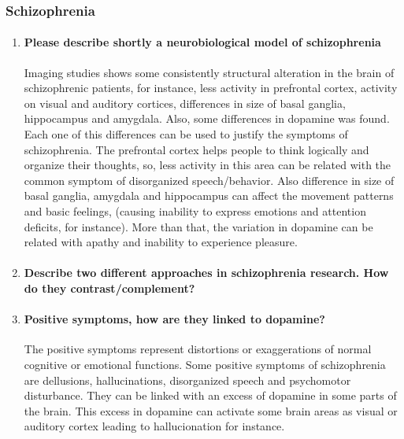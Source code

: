 \documentclass[12pt,article,oneside,a4paper]{memoir}
\begin{document}
\subsubsection{Schizophrenia}
\begin{enumerate}
\item \paragraph{Please describe shortly a neurobiological model of
schizophrenia}\label{question:neurobiology-schizophrenia}
Imaging studies shows some consistently structural alteration in the brain of
schizophrenic patients, for instance, less activity in prefrontal cortex,
activity on visual and auditory cortices, differences in size of basal ganglia,
hippocampus and amygdala. Also, some differences in dopamine was found.
Each one of this differences can be used to justify the symptoms of
schizophrenia.
The prefrontal cortex helps people to think logically and organize their
thoughts, so, less activity in this area can be related with the common symptom
of disorganized speech/behavior. Also difference in size of basal ganglia,
amygdala and hippocampus can affect the movement patterns and basic feelings,
(causing inability to express emotions and attention deficits, for instance).
More than that, the variation in dopamine can be related with apathy and
inability to experience pleasure.

\item \paragraph{Describe two different approaches in schizophrenia research.
How do they contrast/complement?}

\item \paragraph{Positive symptoms, how are they linked to dopamine?}
The positive symptoms represent distortions or exaggerations of normal
cognitive or emotional functions. Some positive symptoms of schizophrenia are
dellusions, hallucinations, disorganized speech and psychomotor disturbance.
They can be linked with an excess of dopamine in some parts of the brain. This
excess in dopamine can activate some brain areas as visual or auditory cortex
leading to hallucionation for instance.


\end{enumerate}
\end{document}
